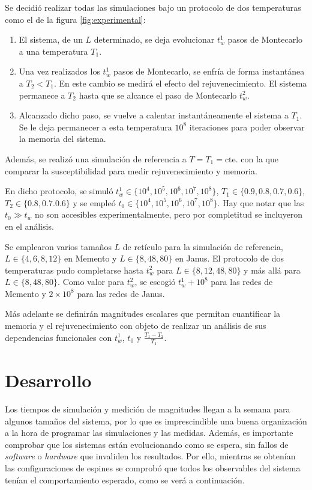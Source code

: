 \documentclass[11pt]{report}
\begin{document}
Se decidió realizar todas las simulaciones bajo un protocolo
de dos temperaturas como el de la figura \ref{fig:experimental}:
\begin{enumerate}
\item El sistema, de un $L$ determinado, se deja evolucionar $t_w^1$
  pasos de Montecarlo a una temperatura $T_1$.
\item Una vez realizados los $t_w^1$ pasos de Montecarlo, se enfría de
  forma instantánea a $T_2<T_1$. En este cambio se medirá el efecto
  del rejuvenecimiento. El sistema permanece a $T_2$ hasta
  que se alcance el paso de Montecarlo $t_w^2$.
\item Alcanzado dicho paso, se vuelve a calentar instantáneamente el
  sistema a $T_1$. Se le deja permanecer a esta temperatura $10^8$
  iteraciones para poder observar la memoria del sistema.
\end{enumerate}
Además, se realizó una simulación de referencia a $T=T_1=\text{cte.}$
con la que comparar la susceptibilidad para medir rejuvenecimiento y memoria.

En dicho protocolo, se simuló
$t_w^1 ∈\{10^4, 10^5, 10^6, 10^7, 10^8\}$,
$T_1∈\{0.9, 0.8, 0.7, 0.6\}$, $T_2∈\{0.8,0.7.0.6\}$ y se empleó
$t_0∈\{10^4, 10^5, 10^6, 10^7,10^8\}$. Hay que notar que las $t_0 ≫
t_w$ no son accesibles experimentalmente, pero por completitud se
incluyeron en el análisis.

Se emplearon varios tamaños $L$
de retículo para la simulación de referencia, $L∈\{4,6,8,12\}$ en
Memento y $L∈\{8,48,80\}$ en Janus. El protocolo de dos temperaturas
pudo completarse hasta $t_w^2$ para $L∈\{8,12,48,80\}$ y más allá para
$L∈\{8,48,80\}$.
Como valor para $t_w^2$, se escogió $t_w^1 + 10^8$ para las redes de
Memento y $2×10^8$ para las redes de Janus.

Más adelante se definirán magnitudes escalares que permitan
cuantificar la memoria y el rejuvenecimiento con objeto de realizar un
análisis de sus dependencias funcionales con $t_w^1$, $t_0$ y
$\frac{T_1-T_2}{T_1}$.


\chapter{Desarrollo}

Los tiempos de simulación y medición de magnitudes llegan a la semana
para algunos tamaños del sistema, por lo que es imprescindible una
buena organización a la hora de programar las simulaciones y las
medidas. Además, es importante comprobar que los sistemas están
evolucionando como se espera, sin fallos de \textit{software} o
\textit{hardware} que invaliden los resultados. Por ello, mientras se
obtenían las configuraciones de espines se comprobó que todos los
observables del sistema tenían el comportamiento esperado, como se
verá a continuación.
\end{document}
